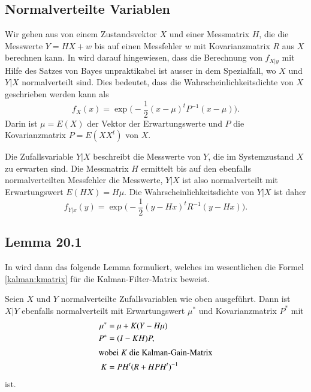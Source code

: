 \subsection{Normalverteilte Variablen\label{subsection:bayesian:normalverteilt}}
Wir gehen aus von einem Zustandsvektor $X$ und einer Messmatrix $H$,
die die Messwerte $Y=HX + w$ bis auf einen Messfehler $w$ mit
Kovarianzmatrix $R$ aus $X$ berechnen kann.
In \cite{skript:kaperengler} wird darauf hingewiesen, dass die Berechnung
von $f_{X|y}$ mit Hilfe des Satzes von Bayes 
unpraktikabel ist ausser in dem Spezialfall, wo $X$ und $Y|X$ 
normalverteilt sind.
Dies bedeutet, dass die Wahrscheinlichkeitsdichte von $X$ geschrieben
werden kann als
\begin{equation}
f_X(x) = \exp\biggl(
-\frac12 (x-\mu)^t P^{-1} (x-\mu)
\biggr).
\label{xverteilung}
\end{equation}
Darin ist $\mu=E(X)$ der Vektor der Erwartungswerte und $P$ die
Kovarianzmatrix $P=E(XX^t)$ von $X$.

Die Zufallsvariable $Y|X$ beschreibt die Messwerte von $Y$, die im
Systemzustand $X$ zu erwarten sind.
Die Messmatrix $H$ ermittelt bis auf den ebenfalls normalverteilten
Messfehler die Messwerte, $Y|X$ ist also normalverteilt mit
Erwartungswert $E(HX)=H\mu$.
Die Wahrscheinlichkeitsdichte von $Y|X$ ist daher
\begin{equation}
f_{Y|x}(y)
=
\exp\biggl(-\frac12
(y-Hx)^tR^{-1}(y-Hx)
\biggr).
\label{yverteilung}
\end{equation}

\subsection{Lemma 20.1\label{subsection:lemma 20.1}}
In \cite{skript:kaperengler} wird dann das folgende Lemma formuliert,
welches im wesentlichen die Formel \eqref{kalman:kmatrix} für die
Kalman-Filter-Matrix beweist.

\begin{lemma*}
Seien $X$ und $Y$ normalverteilte Zufallsvariablen wie oben ausgeführt.
Dann ist $X|Y$ ebenfalls normalverteilt mit
Erwartungswert $\mu^*$ und Kovarianzmatrix $P^*$ mit
\begin{align}
\mu^*
&=
\mu + K(Y - H\mu)
\label{mustern}
\\
P^*
&=
(I-KH)P,
\label{Pstern}
\\
\intertext{wobei $K$ die Kalman-Gain-Matrix}
K
&=
PH^t(R+HPH^t)^{-1}
\label{kalman-formel}
\end{align}
ist.
\end{lemma*}

